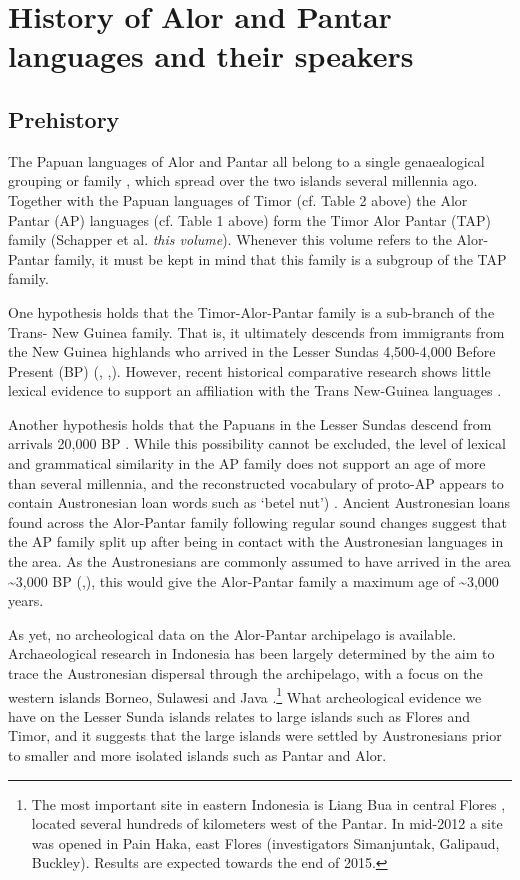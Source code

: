 \section{History of Alor and Pantar languages and their speakers}

\subsection{Prehistory}
The Papuan languages of Alor and Pantar all belong to a single genaealogical grouping or family \citep{HoltonEtAL2010,HoltonEtAl2012,HoltonEtAlthisvolumea}, which spread over the two islands several millennia ago. Together with the Papuan languages of Timor (cf. Table 2 above) the Alor Pantar (AP) languages (cf. Table 1 above) form the Timor Alor Pantar (TAP) family (Schapper et al. \textit{this volume}). Whenever this volume refers to the Alor-Pantar family, it must be kept in mind that this family is a subgroup of the TAP family.

One hypothesis holds that the Timor-Alor-Pantar family is a sub-branch of the Trans- New Guinea family. That is, it ultimately descends from immigrants from the New Guinea highlands who arrived in the Lesser Sundas 4,500-4,000 Before Present (BP) (\citet[123]{Bellwood1997}, \citet[42]{Ross2005},\citet{Pawley2005}). However, recent historical comparative research \citep{RobinsonEtAl2012,HoltonEtAlthisvolumeb} shows little lexical evidence to support an affiliation with the Trans New-Guinea languages \citep[cf.][]{WurmEtAl1975,Ross2005}.

Another hypothesis holds that the Papuans in the Lesser Sundas descend from arrivals 20,000 BP \citep{Summerhayes2007}. While this possibility cannot be excluded, the level of lexical and grammatical similarity in the AP family does not support an age of more than several millennia, and the reconstructed vocabulary of proto-AP appears to contain Austronesian loan words such as  `betel nut') \citep{HoltonEtAl2012,Robinsonta}. Ancient Austronesian loans found across the Alor-Pantar family following regular sound changes suggest that the AP family split up after being in contact with the Austronesian languages in the area. As the Austronesians are commonly assumed to have arrived in the area \~{}3,000 BP (\citet[100]{Pawley2005},\citet{Spriggs2011}), this would give the Alor-Pantar family a maximum age of \~{}3,000 years.

As yet, no archeological data on the Alor-Pantar archipelago is available. Archaeological research in Indonesia has been largely determined by the aim to trace the Austronesian dispersal through the archipelago, with a focus on the western islands Borneo, Sulawesi and Java \citep{Mahirta2006}.\footnote{The most important site in eastern Indonesia is Liang Bua in central Flores \citep{MorwoodEtAl2004}, located several hundreds of kilometers west of the Pantar.  In mid-2012 a site was opened in Pain Haka, east Flores (investigators Simanjuntak, Galipaud, Buckley). Results are expected towards the end of 2015.} What archeological evidence we have on the Lesser Sunda islands relates to large islands such as Flores and Timor, and it suggests that the large islands were settled by Austronesians prior to smaller and more isolated islands such as Pantar and Alor.

